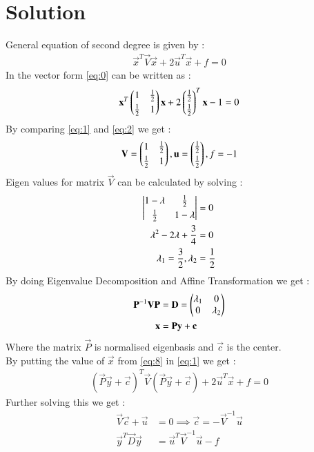 \documentclass[journal,12pt,twocolumn]{IEEEtran}
\begin{document}
\section{\textbf{Solution}}
General equation of second degree is given by :
\begin{align}
\vec{x}^T\vec{V}\vec{x}+2\vec{u}^T\vec{x}+f=0\label{eq:1}
\end{align}
In the vector form \eqref{eq:0} can be written as :
\begin{align}
\mathbf{x}^T\begin{pmatrix}1&\frac{1}{2}\\[0.1cm]\frac{1}{2}&1\end{pmatrix}\mathbf{x}+2\begin{pmatrix}\frac{1}{2}\\[0.1 cm]\frac{1}{2}\end{pmatrix}^T\mathbf{x}-1=0\label{eq:2}
\end{align}
By comparing \eqref{eq:1} and \eqref{eq:2} we get : 
\begin{align}
    \mathbf{V}=\begin{pmatrix}1&\frac{1}{2}\\[0.1cm]\frac{1}{2}&1\end{pmatrix},\mathbf{u}=\begin{pmatrix}\frac{1}{2}\\[0.1 cm]\frac{1}{2}\end{pmatrix},f=-1\label{eq:3}
\end{align}
Eigen values for matrix $\vec{V}$ can be calculated by solving :  
\begin{align}
    \begin{vmatrix}1-\lambda&\frac{1}{2}\\[0.1cm]\frac{1}{2}&1-\lambda\end{vmatrix}&=0\\
    \lambda^2-2\lambda+\frac{3}{4}&=0\\
    \lambda_1=\frac{3}{2},\lambda_2&=\frac{1}{2}
\end{align}
By doing Eigenvalue Decomposition and Affine Transformation we get : 
\begin{align}
    \mathbf{P}^{-1}\mathbf{V}\mathbf{P}&=\mathbf{D}=\begin{pmatrix}\lambda_1&0\\0&\lambda_2\end{pmatrix}\\
    \mathbf{x}&=\mathbf{P}\mathbf{y}+\mathbf{c}\label{eq:8}
\end{align}
Where the matrix $\vec{P}$ is normalised eigenbasis and $\vec{c}$ is the center.\\
By putting the value of $\vec{x}$ from \eqref{eq:8} in \eqref{eq:1} we get : 
\begin{align}
    (\vec{P}\vec{y}+\vec{c})^T\vec{V}(\vec{P}\vec{y}+\vec{c})+2\vec{u}^T\vec{x}+f=0
\end{align}
Further solving this we get : 
\begin{align}
    \vec{V}\vec{c}+\vec{u}&=0\implies\vec{c}=-\vec{V}^{-1}\vec{u}\label{eq:10}\\
    \vec{y}^T\vec{D}\vec{y}&=\vec{u}^T\vec{V}^{-1}\vec{u}-f\label{eq:11}
\end{align}
\end{document}
